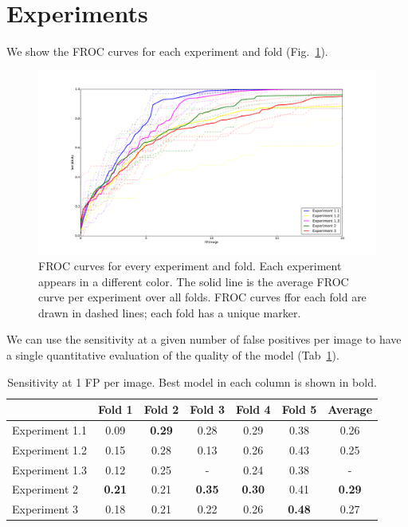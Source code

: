 \section{Experiments}
We show the FROC curves for each experiment and fold (Fig.~\ref{fig:FROCResults}).
\begin{figure}
	\centering
		\includegraphics[width=\textwidth]{plots/FROC_curves.pdf}
	\caption[FROC curves]{FROC curves for every experiment and fold. Each experiment appears in a different color. The solid line is the average FROC curve per experiment over all folds. FROC curves ffor each fold are drawn in dashed lines; each fold has a unique marker.}
	\label{fig:FROCResults}
\end{figure}

We can use the sensitivity at a given number of false positives per image to have a single quantitative evaluation of the quality of the model (Tab~\ref{tab:SensitivityResults}).
\begin{table}[h]
	\centering
	\begin{tabular}{l*{6}{c}}
		\hline
		 & \textbf{Fold 1} & \textbf{Fold 2} & \textbf{Fold 3} &\textbf{Fold 4} &\textbf{Fold 5} & \textbf{Average} \\
		\hline 
		Experiment 1.1	&0.09		&\textbf{0.29}	&0.28	&0.29	&0.38	&0.26\\
		Experiment 1.2	&0.15		&0.28		&0.13		&0.26	&0.43	&0.25\\
		Experiment 1.3	&0.12		&0.25		&-			&0.24	&0.38	&-\\
		Experiment 2	&\textbf{0.21} &0.21	&\textbf{0.35}		&\textbf{0.30}	&0.41	&\textbf{0.29}\\
		Experiment 3	&0.18		&0.21		&0.22		&0.26	&\textbf{0.48}	&0.27\\
		\hline
	\end{tabular}
	\caption[Sensitivity at 1 FP/image for the final models]{Sensitivity at 1 FP per image. Best model in each column is shown in bold.}
	\label{tab:SensitivityResults}
\end{table}

